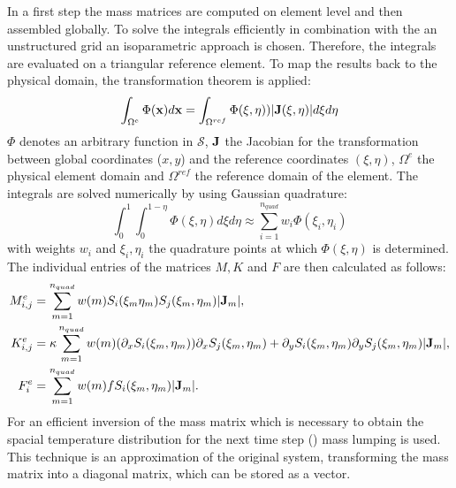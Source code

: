 In a first step the mass matrices are computed on element level and then assembled globally. To solve the integrals efficiently in combination with the an unstructured grid an isoparametric approach is chosen. Therefore, the integrals are evaluated on a triangular reference element. To map the results back to the physical domain, the transformation theorem is applied:
\begin{equation}
	\int_{\Omega^e} \Phi(\boldsymbol{\mathbf{x}}) d\boldsymbol{\mathbf{x}} = \int_{\Omega^{ref}} \Phi(\xi, \eta)) |\boldsymbol{\mathbf{J}}(\xi, \eta)| d\xi d\eta 
\end{equation}
$\Phi$ denotes an arbitrary function in $\mathcal{S}$, $\boldsymbol{\mathbf{J}}$ the Jacobian for the transformation between global coordinates ($x,y$) and the reference coordinates $(\xi, \eta)$, $\Omega^e$ the physical element domain and $\Omega^{ref}$ the reference domain of the element. The integrals are solved numerically by using Gaussian quadrature:
\begin{equation}
	\int_0^1 \int_{0}^{1-\eta} \Phi(\xi, \eta) d\xi d\eta \approx \sum_{i=1}^{n_{quad}} w_i \Phi(\xi_i, \eta_i)
\end{equation}
with weights $w_i$ and $\xi_i, \eta_i$ the quadrature points at which $\Phi(\xi, \eta)$ is determined. The individual entries of the matrices $M,K$ and $F$ are then calculated as follows:
\begin{align}
	M_{i,j}^e &= \sum_{m=1}^{n_{quad}}w(m) S_i(\xi_m \eta_m)S_j(\xi_m, \eta_m) | \boldsymbol{\mathbf{J}}_m | , \label{eq:M} \\ 
	K_{i,j}^e &= \kappa \sum_{m=1}^{n_{quad}}w(m) (\partial_x S_i(\xi_m, \eta_m)) \partial_x S_j(\xi_m, \eta_m) + 
	\partial_y S_i(\xi_m, \eta_m) \partial_y S_j(\xi_m, \eta_m) | \boldsymbol{\mathbf{J}}_m | , \label{eq:K} \\
	F_i^e &=  \sum_{m=1}^{n_{quad}} w(m) f S_i(\xi_m, \eta_m) | \boldsymbol{\mathbf{J}}_m |. \label{eq:F}
 \end{align}
For an efficient inversion of the mass matrix which is necessary to obtain the spacial temperature distribution for the next time step () mass lumping is used. This technique is an approximation of the original system, transforming the mass matrix into a diagonal matrix, which can be stored as a vector.
\newpage

